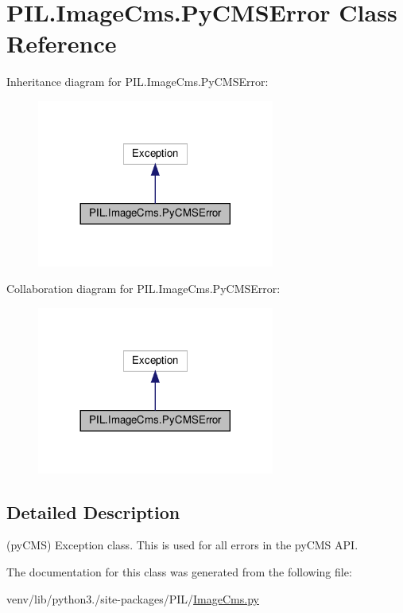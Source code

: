 \hypertarget{classPIL_1_1ImageCms_1_1PyCMSError}{}\section{P\+I\+L.\+Image\+Cms.\+Py\+C\+M\+S\+Error Class Reference}
\label{classPIL_1_1ImageCms_1_1PyCMSError}


Inheritance diagram for P\+I\+L.\+Image\+Cms.\+Py\+C\+M\+S\+Error\+:
\nopagebreak
\begin{figure}[H]
\begin{center}
\leavevmode
\includegraphics[width=221pt]{classPIL_1_1ImageCms_1_1PyCMSError__inherit__graph}
\end{center}
\end{figure}


Collaboration diagram for P\+I\+L.\+Image\+Cms.\+Py\+C\+M\+S\+Error\+:
\nopagebreak
\begin{figure}[H]
\begin{center}
\leavevmode
\includegraphics[width=221pt]{classPIL_1_1ImageCms_1_1PyCMSError__coll__graph}
\end{center}
\end{figure}


\subsection{Detailed Description}
\begin{DoxyVerb}(pyCMS) Exception class.
This is used for all errors in the pyCMS API.\end{DoxyVerb}
 

The documentation for this class was generated from the following file\+:\begin{DoxyCompactItemize}
\item 
venv/lib/python3./site-\/packages/\+P\+I\+L/\hyperlink{ImageCms_8py}{Image\+Cms.\+py}\end{DoxyCompactItemize}
